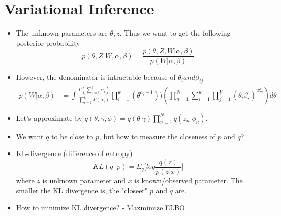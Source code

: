 \documentclass[a4paper, uplatex]{jsarticle} %
\begin{document}
\section{Variational Inference}
\begin{itemize}
\item The unknown parameters are $\theta, z$. Thus we want to get the following posterior probability
$$
p(\theta, Z| W, \alpha, \beta) = \frac{p(\theta, Z, W|\alpha, \beta)}{p(W|\alpha, \beta)} 
$$

        
\item However, the denominator is intractable because of $\theta_i and \beta_{ij}$
\begin{align*}
    p(W|\alpha, \beta) & = \int \frac{\Gamma(\sum_{i=1}^k \alpha_i)}{\prod_{i=1}^k \Gamma(\alpha_i)} \prod_{i=1}^k(\theta^{a_i-1})) (\prod_{n=1}^N \sum_{i=1}^k \prod_{j=1}^V(\theta_i \beta_i)^{w_m^i})d\theta 
\end{align*}

\item Let's approximate by $q(\theta, \gamma, \phi) = q(\theta|\gamma) \prod_{n=1}^N q(z_n|\phi_n)$. 

\item We want $q$ to be close to $p$, but how to measure the closeness of $p$ and $q$? 

\item KL-divergence (difference of entropy)
$$
        KL(q||p) = E_q\Big[log \frac{q(z)}{p(z|x)}\Big]
$$
where $z$ is unknown parameter and $x$ is known/observed parameter. 
The smaller the KL divergence is, the "closeer" $p$ and $q$ are. 

\item How to minimize KL divergence? - Maxmimize ELBO

    
\end{itemize}
\end{document}
